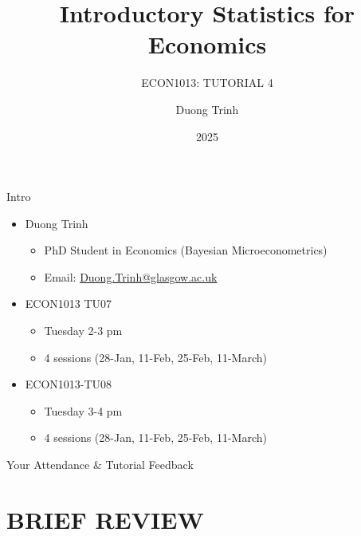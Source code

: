 \documentclass[
  11pt,
  ignorenonframetext,
]{beamer}
\title{Introductory Statistics for Economics}
\subtitle{ECON1013: TUTORIAL 4}
\author{Duong Trinh}
\date{2025}
\institute{University of Glasgow}
\providecommand{\tightlist}{%
  \setlength{\itemsep}{0pt}\setlength{\parskip}{0pt}}
\begin{document}
\frame{\titlepage}

\begin{frame}{Intro}
\protect\hypertarget{intro}{}
\begin{itemize}
\tightlist
\item
  Duong Trinh

  \begin{itemize}
  \tightlist
  \item
    PhD Student in Economics (Bayesian Microeconometrics)
  \item
    Email: \underline{Duong.Trinh@glasgow.ac.uk}
  \end{itemize}
\end{itemize}

\vspace{3mm}

\begin{itemize}
\tightlist
\item
  ECON1013 TU07

  \begin{itemize}
  \tightlist
  \item
    Tuesday 2-3 pm
  \item
    4 sessions (28-Jan, 11-Feb, 25-Feb, 11-March)
  \end{itemize}
\item
  ECON1013-TU08

  \begin{itemize}
  \tightlist
  \item
    Tuesday 3-4 pm
  \item
    4 sessions (28-Jan, 11-Feb, 25-Feb, 11-March)
  \end{itemize}
\end{itemize}
\end{frame}

\begin{frame}{Your Attendance \& Tutorial Feedback}
\protect\hypertarget{your-attendance-tutorial-feedback}{}
\end{frame}

\hypertarget{brief-review}{%
\section{BRIEF REVIEW}\label{brief-review}}
\end{document}
